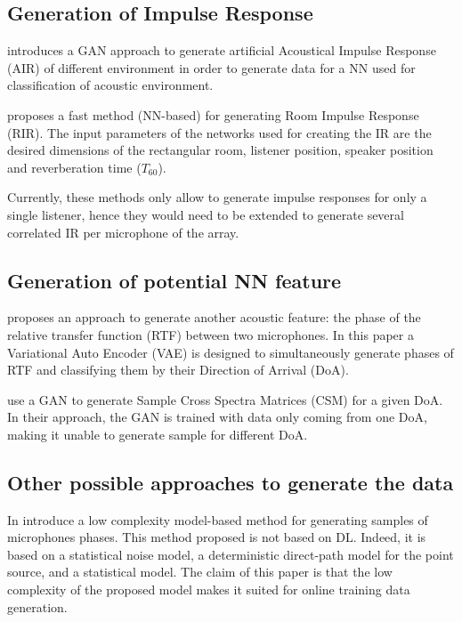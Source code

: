 \documentclass[11pt,a4paper,twoside]{report}
\begin{document}
\subsection{Generation of Impulse Response}

\cite{papayiannis2019data} introduces a GAN approach to generate artificial Acoustical Impulse Response (AIR) of different environment in order to generate data for a NN used for classification of acoustic environment.

\cite{ratnarajah2021fast} proposes a fast method (NN-based) for generating Room Impulse Response (RIR). The input parameters of the networks used for creating the IR are the desired dimensions of the rectangular room, listener position, speaker position and reverberation time ($T_{60}$).

Currently, these methods only allow to generate impulse responses for only a single listener, hence they would need to be extended to generate several correlated IR per microphone of the array.

\subsection{Generation of potential NN feature}

\cite{bianco2020semi} proposes an approach to generate another acoustic feature: the phase of the relative transfer function (RTF) between two microphones. In this paper a Variational Auto Encoder (VAE) is designed to simultaneously generate phases of RTF and classifying them by their Direction of Arrival (DoA).

\cite{gerstoft2020parametric} use a GAN to generate Sample Cross Spectra Matrices (CSM) for a given DoA. In their approach, the GAN is trained with data only coming from one DoA, making it unable to generate sample for different DoA.

\subsection{Other possible approaches to generate the data}

In \cite{hubner2021efficient} introduce a low complexity model-based method for generating samples of microphones phases. This method proposed is not based on DL. Indeed, it is based on a statistical noise model, a deterministic direct-path model for the point source, and a statistical model. The claim of this paper is that the low complexity of the proposed  model makes it suited for online training data generation. 
\end{document}

